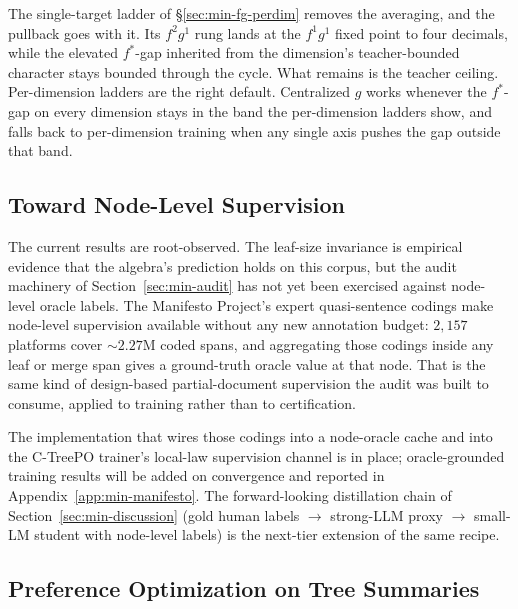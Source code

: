 The single-target ladder of \S\ref{sec:min-fg-perdim} removes the
averaging, and the pullback goes with it. Its $f^2g^1$ rung lands at
the $f^1g^1$ fixed point to four decimals, while the elevated
$f^*$-gap inherited from the dimension's teacher-bounded character
stays bounded through the cycle. What remains is the teacher ceiling.
Per-dimension ladders are the right default. Centralized $g$ works
whenever the $f^*$-gap on every dimension stays in the band the
per-dimension ladders show, and falls back to per-dimension training
when any single axis pushes the gap outside that band.

\subsection{Toward Node-Level Supervision}\label{sec:min-node-supervision}

The current results are root-observed. The leaf-size invariance is
empirical evidence that the algebra's prediction holds on this corpus,
but the audit machinery of Section~\ref{sec:min-audit} has not yet been
exercised against node-level oracle labels. The Manifesto Project's
expert quasi-sentence codings make node-level supervision available
without any new annotation budget: $2{,}157$ platforms cover
$\sim\!2.27$M coded spans, and aggregating those codings inside any leaf
or merge span gives a ground-truth oracle value at that node. That is
the same kind of design-based partial-document supervision the audit was
built to consume, applied to training rather than to certification.

The implementation that wires those codings into a node-oracle cache and
into the C-TreePO trainer's local-law supervision channel is in place;
oracle-grounded training results will be added on convergence and
reported in Appendix~\ref{app:min-manifesto}. The forward-looking
distillation chain of Section~\ref{sec:min-discussion} (gold human
labels $\to$ strong-LLM proxy $\to$ small-LM student with node-level
labels) is the next-tier extension of the same recipe.

\subsection{Preference Optimization on Tree Summaries}\label{sec:min-preference-app}

